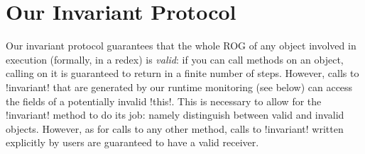 \section{Our Invariant Protocol}
\label{s:protocol}
Our invariant protocol guarantees that the whole ROG of any object involved in execution (formally, in a redex) is \emph{valid}: if you can call methods on an object, calling \Q@invariant@ on it is guaranteed to return \Q@true@ in a finite number of steps. However, calls to \Q!invariant! that are generated by our runtime monitoring (see below) can access the fields of a potentially invalid \Q!this!. This is necessary to allow for the \Q!invariant! method to do its job: namely distinguish between valid and invalid objects. However, as for calls to any other method, calls to \Q!invariant! written explicitly by users are guaranteed to have a valid receiver. 

%

